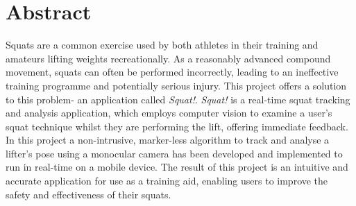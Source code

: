 \section*{Abstract}

Squats are a common exercise used by both athletes in their training and amateurs lifting weights recreationally. As a reasonably advanced compound movement, squats can often be performed incorrectly, leading to an ineffective training programme and potentially serious injury. This project offers a solution to this problem- an application called \emph{Squat!}. \emph{Squat!} is a real-time squat tracking and analysis application, which employs computer vision to examine a user's squat technique whilst they are performing the lift, offering immediate feedback. In this project a non-intrusive, marker-less algorithm to track and analyse a lifter's pose using a monocular camera has been developed and implemented to run in real-time on a mobile device. The result of this project is an intuitive and accurate application for use as a training aid, enabling users to improve the safety and effectiveness of their squats.